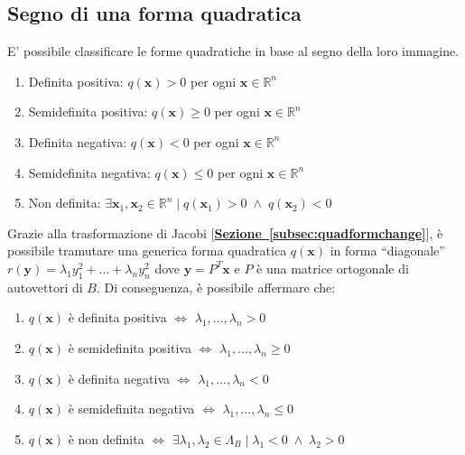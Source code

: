 \documentclass{article}
\begin{document}
\subsection{Segno di una forma quadratica} \label{subsec:quadformsign}
    E' possibile classificare le forme quadratiche in base al segno della loro immagine. 
    \begin{enumerate}[label=(\arabic*)]
        \item Definita positiva: $q(\mathbf{x}) > 0$ per ogni $\mathbf{x} \in \mathbb{R}^{n}$   
        \item Semidefinita positiva: $q(\mathbf{x}) \geq 0$ per ogni $\mathbf{x} \in \mathbb{R}^{n}$   
        \item Definita negativa: $q(\mathbf{x}) < 0$ per ogni $\mathbf{x} \in \mathbb{R}^{n}$   
        \item Semidefinita negativa: $q(\mathbf{x}) \leq 0$ per ogni $\mathbf{x} \in \mathbb{R}^{n}$   
        \item Non definita: $\exists \mathbf{x}_{1}, \mathbf{x}_{2} \in \mathbb{R}^{n} \; | \; q(\mathbf{x}_{1}) > 0 \; \land \; q(\mathbf{x}_{2}) < 0$
    \end{enumerate}

    Grazie alla trasformazione di Jacobi [{\bfseries \hyperref[subsec:quadformchange]{Sezione~\ref{subsec:quadformchange}}}], è possibile tramutare una generica forma quadratica $q(\mathbf{x})$ in forma ``diagonale'' $r(\mathbf{y}) = \lambda_1 y_{1}^{2} + ... + \lambda_n y_{n}^{2}$ dove $\mathbf{y} = P^{T} \mathbf{x}$ e $P$ è una matrice ortogonale di autovettori di $B$.
    Di conseguenza, è possibile affermare che:
    \begin{enumerate}[label=(\arabic*)]
        \item $q(\mathbf{x})$ è definita positiva $\iff$ $\lambda_1, ..., \lambda_n > 0$ 
        \item $q(\mathbf{x})$ è semidefinita positiva $\iff$ $\lambda_1, ..., \lambda_n \geq 0$ 
        \item $q(\mathbf{x})$ è definita negativa $\iff$ $\lambda_1, ..., \lambda_n < 0$ 
        \item $q(\mathbf{x})$ è semidefinita negativa $\iff$ $\lambda_1, ..., \lambda_n \leq 0$ 
        \item $q(\mathbf{x})$ è non definita $\iff$ $\exists \lambda_1, \lambda_2 \in \Lambda_B \; | \; \lambda_1 < 0 \; \land \; \lambda_2 > 0$ 
    \end{enumerate}
\end{document}
